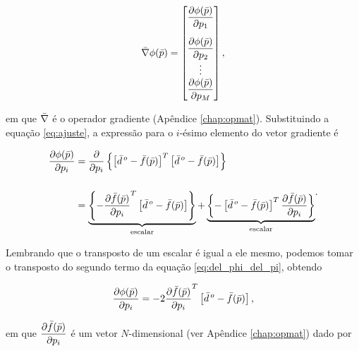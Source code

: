 \begin{equation}
\vect{\nabla} \phi(\vect{p}) =
    \begin{bmatrix}
        \dfrac{\partial \phi(\vect{p})}{\partial p_1} \vspace{0.3cm}\\
        \dfrac{\partial \phi(\vect{p})}{\partial p_2}\\
        \vdots \\
        \dfrac{\partial \phi(\vect{p})}{\partial p_M}
    \end{bmatrix} ,
\label{eq:gradphi_partial}
\end{equation} 

\noindent em que $\bar{\nabla}$ é o operador gradiente (Apêndice \ref{chap:opmat}).
Substituindo a equação \ref{eq:ajuste}, a expressão para o $i$-ésimo elemento do
vetor gradiente é

\begin{equation}
\begin{split}
\dfrac{\partial \phi(\bar{p})}{\partial p_i} &=
    \dfrac{\partial}{\partial p_i}\left\{
        \left[\bar{d}^{\thinspace o} - \bar{f}(\bar{p})\right]^T
        \left[\bar{d}^{\thinspace o} - \bar{f}(\bar{p})\right]
    \right\} \\[0.5cm]
    &= 
    \underbrace{
    \left\{-\dfrac{\partial\bar{f}(\bar{p})}{\partial p_i}^T
            \left[\bar{d}^{\thinspace o} - \bar{f}(\bar{p})\right]
    \right\}}_{\text{escalar}}
    +
    \underbrace{
    \left\{-\left[\bar{d}^{\thinspace o} - \bar{f}(\bar{p})\right]^T            
            \dfrac{\partial\bar{f}(\bar{p})}{\partial p_i}
    \right\}}_{\text{escalar}}
\end{split} .
\label{eq:del_phi_del_pi}
\end{equation}

\indent Lembrando que o transposto de um escalar é igual a ele mesmo, podemos
tomar o transposto do segundo termo da equação \ref{eq:del_phi_del_pi},
obtendo

\begin{equation}
\dfrac{\partial \phi(\bar{p})}{\partial p_i} = 
    -2\dfrac{\partial\bar{f}(\bar{p})}{\partial p_i}^T
    \left[\bar{d}^{\thinspace o} - \bar{f}(\bar{p})\right],
\label{eq:del_phi_del_pi_simple}
\end{equation}

\noindent em que $\dfrac{\partial\bar{f}(\bar{p})}{\partial p_i}$ é um vetor
$N$-dimensional (ver Apêndice \ref{chap:opmat}) dado por


